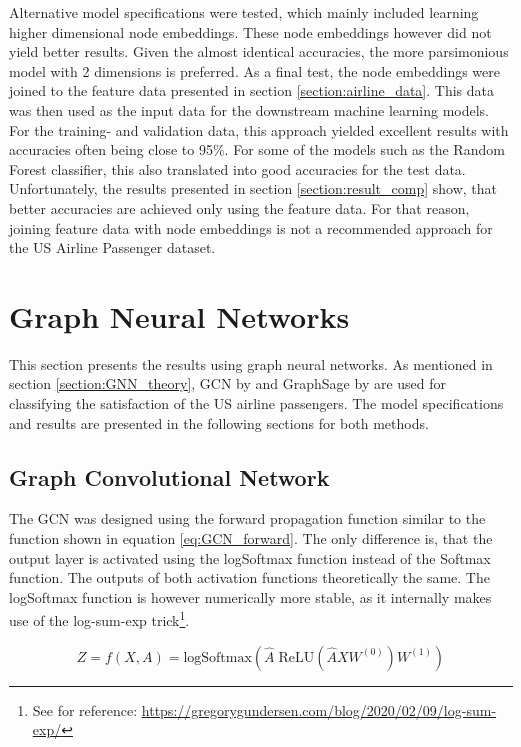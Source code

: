   \noindent Alternative model specifications were tested, which mainly included
  learning higher dimensional node embeddings. These node embeddings however
  did not yield better results. Given the almost identical accuracies, the more
  parsimonious model with 2 dimensions is preferred. As a final test, the node
  embeddings were joined to the feature data presented in section 
  \ref{section:airline_data}. This data was then used as the input data for the
  downstream machine learning models. For the training- and validation data,
  this approach yielded excellent results with accuracies often being close to 
  95\%. For some of the models such as the Random Forest classifier, this also
  translated into good accuracies for the test data. Unfortunately, the results 
  presented in section \ref{section:result_comp} show, that better accuracies 
  are achieved only using the feature data. For that reason, joining feature 
  data with node embeddings is not a recommended approach for the US Airline 
  Passenger dataset.

  \section{Graph Neural Networks}

  This section presents the results using graph neural networks. As
  mentioned in section \ref{section:GNN_theory}, GCN by \cite{kipf2016semi} and
  GraphSage by \cite{hamilton2017inductive} are used for classifying the
  satisfaction of the US airline passengers. The model specifications 
  and results are presented in the following sections for both methods.

  \subsection{Graph Convolutional Network}

  The GCN was designed using the forward propagation function similar to the
  function shown in equation \ref{eq:GCN_forward}. The only difference is, that
  the output layer is activated using the logSoftmax function instead of the
  Softmax function. The outputs of both activation functions theoretically the 
  same. The logSoftmax function is however numerically more stable, as it 
  internally makes use of the log-sum-exp trick\footnote{See for reference: 
  \url{https://gregorygundersen.com/blog/2020/02/09/log-sum-exp/}}.

  \begin{equation}
	  Z = f(X,A) = \text{logSoftmax}\left(\hat A \;\text{ReLU}\left(\hat A X
	  W^{(0)}\right)W^{(1)}\right)
      \label{eq:GCN_forward_1}
  \end{equation}

